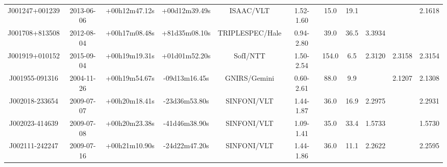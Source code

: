 \begin{landscape}
\begin{minipage}{\linewidth}
\begin{tabular}{ccccccccccc}
 J001247+001239 &  2013-06-06 &  +00h12m47.12s &  +00d12m39.49s &        ISAAC/VLT &  1.52-1.60 &      15.0 &  19.1 &         &         &  2.1618 \\
 J001708+813508 &  2012-08-04 &  +00h17m08.48s &  +81d35m08.10s &  TRIPLESPEC/Hale &  0.94-2.80 &      39.0 &  36.5 &  3.3934 &         &         \\
 J001919+010152 &  2015-09-04 &  +00h19m19.31s &  +01d01m52.20s &         SofI/NTT &  1.50-2.54 &     154.0 &   6.5 &  2.3120 &  2.3158 &  2.3154 \\
 J001955-091316 &  2004-11-26 &  +00h19m54.67s &  -09d13m16.45s &     GNIRS/Gemini &  0.60-2.61 &      88.0 &   9.9 &         &  2.1207 &  2.1308 \\
 J002018-233654 &  2009-07-07 &  +00h20m18.41s &  -23d36m53.80s &      SINFONI/VLT &  1.44-1.87 &      36.0 &  16.9 &  2.2975 &         &  2.2931 \\
 J002023-414639 &  2009-07-08 &  +00h20m23.38s &  -41d46m38.90s &      SINFONI/VLT &  1.09-1.41 &      35.0 &  33.4 &  1.5733 &         &  1.5730 \\
 J002111-242247 &  2009-07-16 &  +00h21m10.90s &  -24d22m47.20s &      SINFONI/VLT &  1.44-1.86 &      36.0 &  11.1 &  2.2622 &         &  2.2595 \\
    \bottomrule
    \end{tabular}
    \end{minipage}
\end{landscape}
